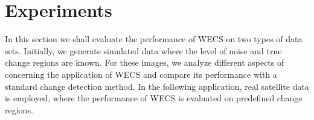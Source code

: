 \documentclass[journal]{IEEEtran}
\newcommand{\vD}{{\textbf D}}
\newcommand{\vd}{{\textbf d}}
\begin{document}
%
%


\section{Experiments}

In this section we shall evaluate the performance of WECS on two types of data sets. Initially, we generate simulated data where the level of noise and true change regions are known. For these images, we analyze different aspects of concerning the application of WECS and compare its performance with a standard change detection method. In the following application, real satellite data is employed, where the performance of WECS is evaluated on predefined change regions.
\end{document}
